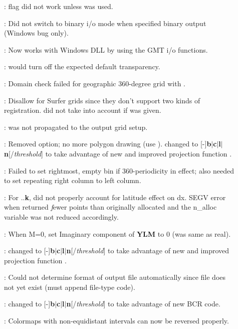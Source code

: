 \begin{description}
\item []:  flag did not work unless  was used.
\item []: Did not switch to binary i/o mode when
 specified binary output (Windows bug only).
\item []: Now works with Windows DLL by using the GMT i/o functions.
\item []:  would turn off the expected default transparency.
\item []: Domain check failed for geographic 360-degree grid with .
\item []: Disallow  for Surfer grids since they don't support two
kinds of registration.  did not take into account if  was given.
\item []:  was not propagated to the output grid setup.
\item []: Removed  option; no more polygon drawing (use ).
 changed to [-]{\bf b$|$c$|$l$|$n}[/{\it threshold}] to
take advantage of new and improved projection function .
\item []: Failed to set rightmost, empty bin if 360-periodicity in effect;
also needed to set repeating right column to left column.
\item []: For ..{\bf k}, did not properly account for latitude effect on dx.
SEGV error when  returned {\emph fewer} points
than originally allocated and the n\_alloc variable was not reduced accordingly.
\item []: When M=0, set Imaginary component of {\bf YLM} to 0 (was same as real).
\item []:  changed to [-]{\bf b$|$c$|$l$|$n}[/{\it threshold}] to
take advantage of new and improved projection function .
\item []: Could not determine format of output file automatically since file
does not yet exist (must append file-type code).
\item []:  changed to [-]{\bf b$|$c$|$l$|$n}[/{\it threshold}] to
take advantage of new BCR code.
\item []: Colormaps with non-equidistant intervals can now be reversed properly.

\end{description}

